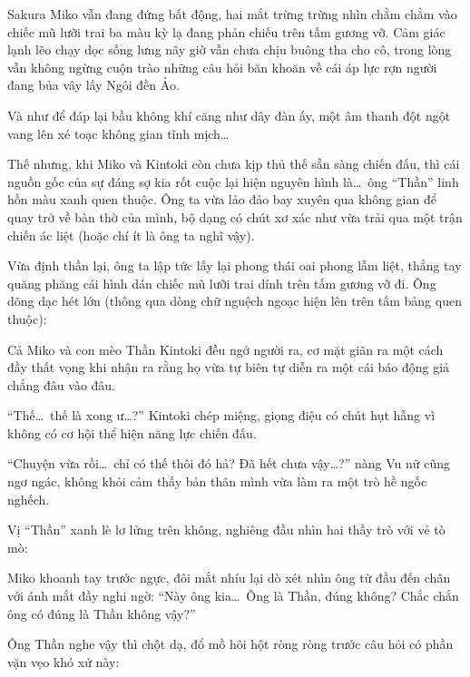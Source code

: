 \documentclass[../main.tex]{subfiles}
\begin{document}
Sakura Miko vẫn đang đứng bất động, hai mắt trừng trừng nhìn chằm chằm vào chiếc mũ lưỡi trai ba màu kỳ lạ đang phản chiếu trên tấm gương vỡ. Cảm giác lạnh lẽo chạy dọc sống lưng nãy giờ vẫn chưa chịu buông tha cho cô, trong lòng vẫn không ngừng cuộn trào những câu hỏi băn khoăn về cái áp lực rợn người đang bủa vây lấy Ngôi đền Ảo.

Và như để đáp lại bầu không khí căng như dây đàn ấy, một âm thanh đột ngột vang lên xé toạc không gian tĩnh mịch\dots


Thế nhưng, khi Miko và Kintoki còn chưa kịp thủ thế sẵn sàng chiến đấu, thì cái nguồn gốc của sự đáng sợ kia rốt cuộc lại hiện nguyên hình là\dots\ ông ``Thần'' linh hồn màu xanh quen thuộc. Ông ta vừa lảo đảo bay xuyên qua không gian để quay trở về bàn thờ của mình, bộ dạng có chút xơ xác như vừa trải qua một trận chiến ác liệt (hoặc chí ít là ông ta nghĩ vậy).

Vừa định thần lại, ông ta lập tức lấy lại phong thái oai phong lẫm liệt, thẳng tay quăng phăng cái hình dán chiếc mũ lưỡi trai dính trên tấm gương vỡ đi. Ông dõng dạc hét lớn (thông qua dòng chữ nguệch ngoạc hiện lên trên tấm bảng quen thuộc):



Cả Miko và con mèo Thần Kintoki đều ngớ người ra, cơ mặt giãn ra một cách đầy thất vọng khi nhận ra rằng họ vừa tự biên tự diễn ra một cái báo động giả chẳng đâu vào đâu.

``Thế\dots\ thế là xong ư\dots?'' Kintoki chép miệng, giọng điệu có chút hụt hẫng vì không có cơ hội thể hiện năng lực chiến đấu.

``Chuyện vừa rồi\dots\ chỉ có thế thôi đó hả? Đã hết chưa vậy\dots?'' nàng Vu nữ cũng ngơ ngác, không khỏi cảm thấy bản thân mình vừa làm ra một trò hề ngốc nghếch.

Vị ``Thần'' xanh lè lơ lửng trên không, nghiêng đầu nhìn hai thầy trò với vẻ tò mò:


Miko khoanh tay trước ngực, đôi mắt nhíu lại dò xét nhìn ông từ đầu đến chân với ánh mắt đầy nghi ngờ: ``Này ông kia\dots\ Ông là Thần, đúng không? Chắc chắn ông có đúng là Thần không vậy?''

Ông Thần nghe vậy thì chột dạ, đổ mồ hôi hột ròng ròng trước câu hỏi có phần vặn vẹo khó xử này:
\end{document}
